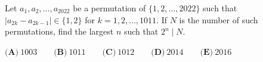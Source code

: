 Let $a_1,a_2,\dots,a_{2022}$ be a permutation of $\{1,2,\dots,2022\}$ such that $|a_{2k}-a_{2k-1}|\in\{1,2\}$ for $k=1,2,\dots,1011$. If $N$ is the number of such permutations, find the largest $n$ such that $2^n\mid N$.

$\textbf{(A)}\ 1003\qquad\textbf{(B)}\ 1011\qquad\textbf{(C)}\ 1012\qquad\textbf{(D)}\ 2014\qquad\textbf{(E)}\ 2016$
